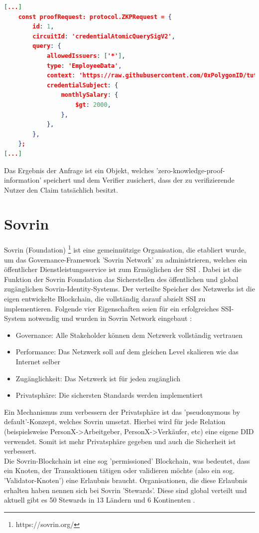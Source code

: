 \begin{lstlisting}[language=json,firstnumber=1]	
[...]
    const proofRequest: protocol.ZKPRequest = {
		id: 1,
		circuitId: 'credentialAtomicQuerySigV2',
		query: {
			allowedIssuers: ['*'],
			type: 'EmployeeData',
			context: 'https://raw.githubusercontent.com/0xPolygonID/tutorial-examples/main/credential-schema/schemas-examples/employee-data/employee-data.jsonld',
			credentialSubject: {
				monthlySalary: {
					$gt: 2000,
				},
			},
		},
	};
[...]
\end{lstlisting}
Das Ergebnis der Anfrage ist ein Objekt, welches 'zero-knowledge-proof-information' speichert und dem Verifier zusichert, dass der zu verifizierende Nutzer den Claim tatsächlich besitzt.

\section{Sovrin}
\label{sovrin}
Sovrin (Foundation) \footnote{https://sovrin.org/} ist eine gemeinnützige Organisation, die etabliert wurde, um das Governance-Framework 'Sovrin Network' zu administrieren, welches ein öffentlicher Dienstleistungsservice ist zum Ermöglichen der SSI \cite{ID39}. Dabei ist die Funktion der Sovrin Foundation das Sicherstellen des öffentlichen und global zugänglichen Sovrin-Identity-Systems.
Der verteilte Speicher des Netzwerks ist die eigen entwickelte Blockchain, die vollständig darauf abzielt SSI zu implementieren. Folgende vier Eigenschaften seien für ein erfolgreiches SSI-System notwendig und wurden in Sovrin Network eingebaut \cite{ID40}:
\begin{itemize}
	\item Governance: Alle Stakeholder können dem Netzwerk vollständig vertrauen
	\item Performance: Das Netzwerk soll auf dem gleichen Level skalieren wie das Internet selber
	\item Zugänglichkeit: Das Netzwerk ist für jeden zugänglich
	\item Privatsphäre: Die sichersten Standards werden implementiert
\end{itemize}
Ein Mechanismus zum verbessern der Privatsphäre ist das 'pseudonymous by default'-Konzept, welches Sovrin umsetzt. Hierbei wird für jede Relation (beispielsweise PersonX->Arbeitgeber, PersonX->Verkäufer, etc) eine eigene DID verwendet. Somit ist mehr Privatsphäre gegeben und auch die Sicherheit ist verbessert. \\
Die Sovrin-Blockchain ist eine sog 'permissioned' Blockchain, was bedeutet, dass ein Knoten, der Transaktionen tätigen oder validieren möchte (also ein sog. 'Validator-Knoten') eine Erlaubnis braucht. Organisationen, die diese Erlaubnis erhalten haben nennen sich bei Sovrin 'Stewards'. Diese sind global verteilt und aktuell gibt es 50 Stewards in 13 Ländern und 6 Kontinenten \cite{ID43}. 
